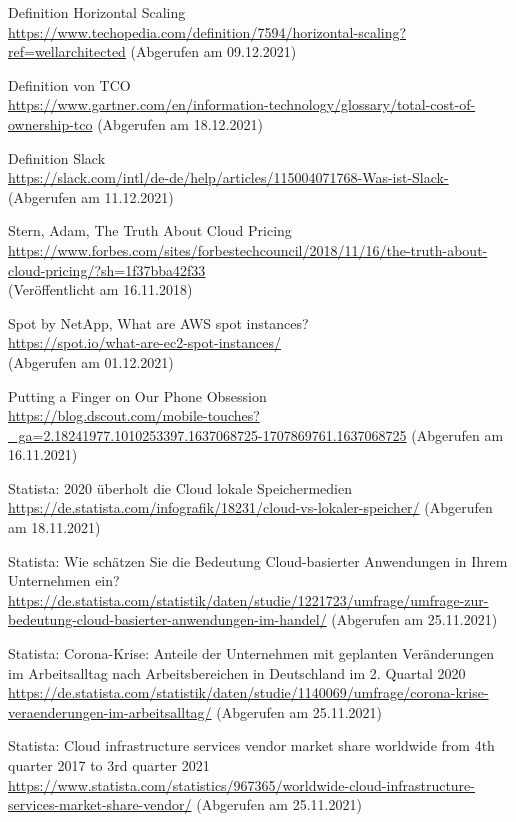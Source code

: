 \begin{thebibliography}{HR08}
   Definition Horizontal Scaling\\
 \url{https://www.techopedia.com/definition/7594/horizontal-scaling?ref=wellarchitected}
 (Abgerufen am 09.12.2021)

  Definition von TCO\\
 \url{https://www.gartner.com/en/information-technology/glossary/total-cost-of-ownership-tco}
 (Abgerufen am 18.12.2021)

  Definition Slack\\
 \url{https://slack.com/intl/de-de/help/articles/115004071768-Was-ist-Slack-}
 (Abgerufen am 11.12.2021)

  Stern, Adam, The Truth About Cloud Pricing \\
  \url{https://www.forbes.com/sites/forbestechcouncil/2018/11/16/the-truth-about-cloud-pricing/?sh=1f37bba42f33}\\
  (Veröffentlicht am 16.11.2018)

 Spot by NetApp, What are AWS spot instances?\\
  \url{https://spot.io/what-are-ec2-spot-instances/}\\
  (Abgerufen am 01.12.2021)
  
    Putting a Finger on Our Phone Obsession\\
 \url{https://blog.dscout.com/mobile-touches?_ga=2.18241977.1010253397.1637068725-1707869761.1637068725}
 (Abgerufen am 16.11.2021)

    Statista: 2020 überholt die Cloud lokale Speichermedien\\
 \url{https://de.statista.com/infografik/18231/cloud-vs-lokaler-speicher/}
 (Abgerufen am 18.11.2021)

    Statista: Wie schätzen Sie die Bedeutung Cloud-basierter Anwendungen in Ihrem Unternehmen ein?\\
 \url{https://de.statista.com/statistik/daten/studie/1221723/umfrage/umfrage-zur-bedeutung-cloud-basierter-anwendungen-im-handel/}
 (Abgerufen am 25.11.2021) 
  
    Statista: Corona-Krise: Anteile der Unternehmen mit geplanten Veränderungen im Arbeitsalltag nach Arbeitsbereichen in Deutschland im 2. Quartal 2020\\
 \url{https://de.statista.com/statistik/daten/studie/1140069/umfrage/corona-krise-veraenderungen-im-arbeitsalltag/}
 (Abgerufen am 25.11.2021) 
   
   Statista: Cloud infrastructure services vendor market share worldwide from 4th quarter 2017 to 3rd quarter 2021\\
 \url{https://www.statista.com/statistics/967365/worldwide-cloud-infrastructure-services-market-share-vendor/}
 (Abgerufen am 25.11.2021) 
  

\end{thebibliography}
